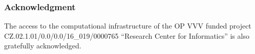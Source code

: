 \subsubsection*{Acknowledgment}

The access to the computational infrastructure of the OP VVV funded project CZ.02.1.01/0.0/0.0/16\_019/0000765 ``Research Center for Informatics'' is also gratefully acknowledged.
